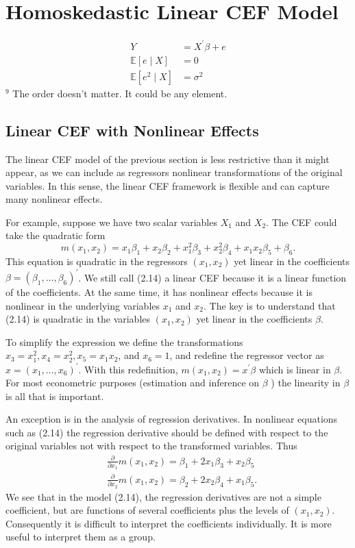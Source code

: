 \documentclass[10pt]{article}
\begin{document}
\section{Homoskedastic Linear CEF Model}
$$
\begin{aligned}
Y &=X^{\prime} \beta+e \\
\mathbb{E}[e \mid X] &=0 \\
\mathbb{E}\left[e^{2} \mid X\right] &=\sigma^{2}
\end{aligned}
$$
${ }^{9}$ The order doesn't matter. It could be any element.

\subsection{Linear CEF with Nonlinear Effects}
The linear CEF model of the previous section is less restrictive than it might appear, as we can include as regressors nonlinear transformations of the original variables. In this sense, the linear CEF framework is flexible and can capture many nonlinear effects.

For example, suppose we have two scalar variables $X_{1}$ and $X_{2}$. The CEF could take the quadratic form
$$
m\left(x_{1}, x_{2}\right)=x_{1} \beta_{1}+x_{2} \beta_{2}+x_{1}^{2} \beta_{3}+x_{2}^{2} \beta_{4}+x_{1} x_{2} \beta_{5}+\beta_{6} .
$$
This equation is quadratic in the regressors $\left(x_{1}, x_{2}\right)$ yet linear in the coefficients $\beta=\left(\beta_{1}, \ldots, \beta_{6}\right)^{\prime}$. We still call (2.14) a linear CEF because it is a linear function of the coefficients. At the same time, it has nonlinear effects because it is nonlinear in the underlying variables $x_{1}$ and $x_{2}$. The key is to understand that (2.14) is quadratic in the variables $\left(x_{1}, x_{2}\right)$ yet linear in the coefficients $\beta$.

To simplify the expression we define the transformations $x_{3}=x_{1}^{2}, x_{4}=x_{2}^{2}, x_{5}=x_{1} x_{2}$, and $x_{6}=1$, and redefine the regressor vector as $x=\left(x_{1}, \ldots, x_{6}\right)^{\prime}$. With this redefinition, $m\left(x_{1}, x_{2}\right)=x^{\prime} \beta$ which is linear in $\beta$. For most econometric purposes (estimation and inference on $\beta$ ) the linearity in $\beta$ is all that is important.

An exception is in the analysis of regression derivatives. In nonlinear equations such as (2.14) the regression derivative should be defined with respect to the original variables not with respect to the transformed variables. Thus
$$
\begin{aligned}
&\frac{\partial}{\partial x_{1}} m\left(x_{1}, x_{2}\right)=\beta_{1}+2 x_{1} \beta_{3}+x_{2} \beta_{5} \\
&\frac{\partial}{\partial x_{2}} m\left(x_{1}, x_{2}\right)=\beta_{2}+2 x_{2} \beta_{4}+x_{1} \beta_{5} .
\end{aligned}
$$
We see that in the model (2.14), the regression derivatives are not a simple coefficient, but are functions of several coefficients plus the levels of $\left(x_{1}, x_{2}\right)$. Consequently it is difficult to interpret the coefficients individually. It is more useful to interpret them as a group.
\end{document}
